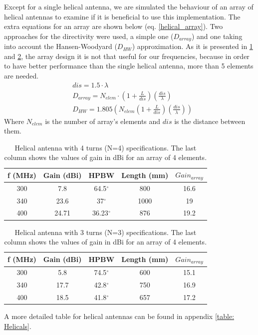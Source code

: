 \noindent
Except for a single helical antenna, we are simulated the behaviour of an array of helical antennas to examine if it is beneficial to use this implementation. The extra equations for an array are shown below (eq. \ref{helical_array}). Two approaches for the directivity were used, a simple one ($D_{array}$) and one taking into account the Hansen-Woodyard ($D_{HW}$) approximation. As it is presented in \ref{table: Helicals1} and \ref{table: Helicals2}, the array design it is not that useful for our frequencies, because in order to have better performance than the single helical antenna, more than 5 elements are needed.
\begin{subequations}
\begin{align}
    &dis=1.5 \cdot \lambda \\
    &D_{array}=N_{elem} \cdot (1+\frac{L}{dis})(\frac{dis}{\lambda}) \\
    &D_{HW}=1.805(N_{elem}(1+\frac{L}{dis})(\frac{dis}{\lambda})) 
\end{align}
\label{helical_array}
\end{subequations}
Where $N_{elem}$ is the number of array's elements and $dis$ is the distance between them. 

\begin{table}[htb]
\centering
\begin{tabular}{| c | c | c | c | c |}
\hline
 f (MHz) & Gain (dBi) & HPBW & Length (mm) & $Gain_{array}$ \\ 
 \hline
 300 & 7.8 & 64.5$^\circ$ & 800 & 16.6 \\  
 \hline
 340 & 23.6 & 37$^\circ$ & 1000 & 19\\
 \hline
  400 & 24.71 & 36.23$^\circ$ & 876 & 19.2 \\
 \hline
\end{tabular}
\caption{Helical antenna with 4 turns (N=4) specifications. The last column shows the values of gain in dBi for an array of 4 elements.}
\label{table: Helicals1}
\end{table}

\begin{table}[htb]
\centering
\begin{tabular}{| c | c | c | c | c |}
\hline
 f (MHz) & Gain (dBi) & HPBW & Length (mm) & $Gain_{array}$ \\ 
 \hline
 300 & 5.8 & 74.5$^\circ$ & 600 & 15.1 \\  
 \hline
 340 & 17.7 & 42.8$^\circ$ & 750 & 16.9\\
 \hline
  400 & 18.5 & 41.8$^\circ$ & 657 & 17.2 \\
 \hline
\end{tabular}
\caption{Helical antenna with 3 turns (N=3) specifications. The last column shows the values of gain in dBi for an array of 4 elements.}
\label{table: Helicals2}
\end{table}
\noindent
A more detailed table for helical antennas can be found in appendix \ref{table: Helicals}.

